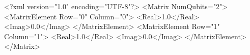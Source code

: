 <?xml version="1.0" encoding="UTF-8"?>
<Matrix NumQubits="2">
  <MatrixElement Row="0" Column="0">
    <Real>1.0</Real>
    <Imag>0.0</Imag>
  </MatrixElement>
  <MatrixElement Row="1" Column="1">
    <Real>1.0</Real>
    <Imag>0.0</Imag>
  </MatrixElement>
</Matrix>
